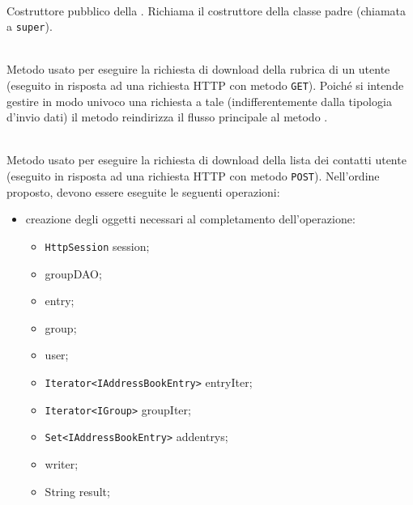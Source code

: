 \begin{description}
	\item{}\\
	Costruttore pubblico della . Richiama il costruttore della classe padre (chiamata a \texttt{super}).
	
	\item{}\\
	Metodo usato per eseguire la richiesta di download della rubrica di un utente (eseguito in risposta ad una richiesta HTTP con metodo \texttt{GET}). Poiché si intende gestire in modo univoco una richiesta a tale  (indifferentemente dalla tipologia d'invio dati) il metodo reindirizza il flusso principale al metodo .
	
\item{}\\	
	Metodo usato per eseguire la richiesta di download della lista dei contatti utente (eseguito in risposta ad una richiesta HTTP con metodo \texttt{POST}). Nell'ordine proposto, devono essere eseguite le seguenti operazioni:
	\begin{itemize}
		\item creazione degli oggetti necessari al completamento dell'operazione:
		\begin{itemize}
			\item \texttt{HttpSession} session;
			\item {} groupDAO;
			\item {} entry;
			\item {} group;
			\item {} user;
			\item \texttt{Iterator<IAddressBookEntry>} entryIter;
			\item \texttt{Iterator<IGroup>} groupIter;
			\item \texttt{Set<IAddressBookEntry>} addentrys;
			\item {} writer;
			\item String result;
		\end{itemize}
		

\end{itemize}
\end{description}
